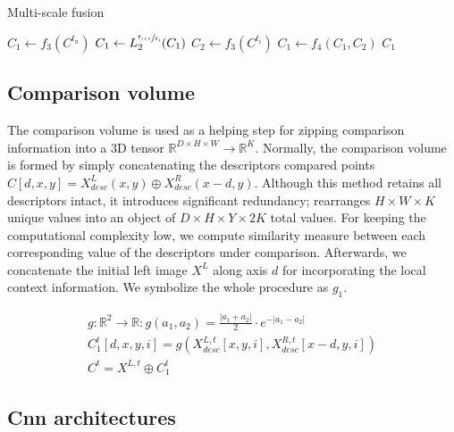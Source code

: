 \documentclass[10pt]{article}
\begin{document}
\begin{algorithm}
\caption{Multi-scale fusion}\label{alg:multi_scale_fusion}
\begin{algorithmic}[1]
\State $C_1 \gets f_3(C^{t_n})$ 
\State $C_1 \gets L_2^{\sfrac{ t_{i+1} }{ t_i } }(C_1)$ 
\State $C_2 \gets f_3(C^{t_i})$ 
\State $C_1 \gets f_4(C_1, C_2)$ 
\EndFor
\State \Return $C_1$
\EndProcedure
\end{algorithmic}
\end{algorithm}


\subsection{Comparison volume} \label{sec:comparison_volume}

The comparison volume is used as a helping step for zipping comparison information into a 3D tensor $\mathbb{R}^{D \times H \times W} \rightarrow \mathbb{R}^K$. Normally, the comparison volume is formed by simply concatenating the descriptors compared points $C[d, x, y]  = X^L_{desc}(x,y) \oplus  X^R_{desc}(x-d,y)$. Although this method retains all descriptors intact, it introduces significant redundancy; rearranges $H \times W \times K$ unique values into an object of $D \times H \times Y \times 2K$ total values. For keeping the computational complexity low, we compute similarity measure between each corresponding value of the descriptors under comparison. Afterwards, we concatenate the initial left image $X^L$ along axis $d$ for incorporating the local context information. We symbolize the whole procedure as $g_1$.

\begin{equation}
\begin{gathered} \label{eq:comparison_volume}
    g: \mathbb{R}^2 \rightarrow \mathbb{R}: g(a_1, a_2) = \frac{|a_1 + a_2|}{2} \cdot e^{-|a_1 - a_2|} \\
    C_1^t[d, x, y, i] = g( X^{L, t}_{desc}[x,y,i], X^{R, t}_{desc}[x-d,y, i]) \\
    C^t = X^{L, t} \oplus C_1^t
\end{gathered}
\end{equation}

\subsection{Cnn architectures}
\end{document}
